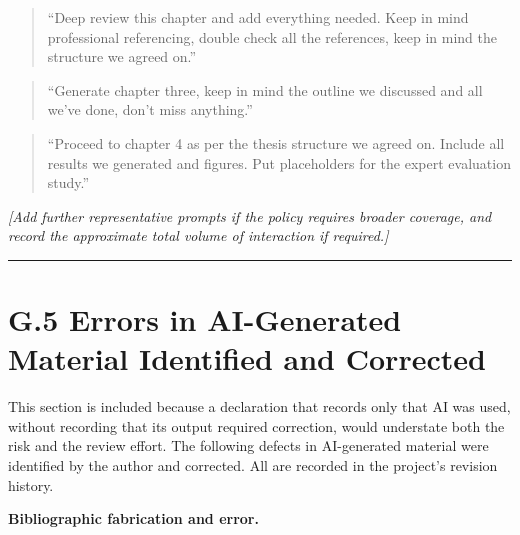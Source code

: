 \begin{quote}
``Deep review this chapter and add everything needed. Keep in mind professional referencing, double check all the references, keep in mind the structure we agreed on.''
\end{quote}

\begin{quote}
``Generate chapter three, keep in mind the outline we discussed and all we've done, don't miss anything.''
\end{quote}

\begin{quote}
``Proceed to chapter 4 as per the thesis structure we agreed on. Include all results we generated and figures. Put placeholders for the expert evaluation study.''
\end{quote}

\emph{{[}Add further representative prompts if the policy requires broader coverage, and record the approximate total volume of interaction if required.{]}}

\begin{center}\rule{0.5\linewidth}{0.5pt}\end{center}

\hypertarget{g.5-errors-in-ai-generated-material-identified-and-corrected}{%
\section{G.5 Errors in AI-Generated Material Identified and Corrected}\label{g.5-errors-in-ai-generated-material-identified-and-corrected}}

This section is included because a declaration that records only that AI was used, without recording that its output required correction, would understate both the risk and the review effort. The following defects in AI-generated material were identified by the author and corrected. All are recorded in the project's revision history.

\textbf{Bibliographic fabrication and error.}

